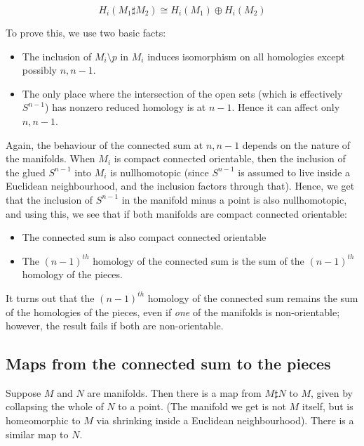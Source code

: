 \documentclass[a4paper]{amsart}
\begin{document}
$$H_i(M_1 \sharp M_2) \cong H_i(M_1) \oplus H_i(M_2)$$

To prove this, we use two basic facts:

\begin{itemize}

\item The inclusion of $M_i \setminus p$ in $M_i$ induces isomorphism
  on all homologies except possibly $n, n - 1$.

\item The only place where the intersection of the open sets (which is
  effectively $S^{n-1}$) has nonzero reduced homology is at
  $n-1$. Hence it can affect only $n,n-1$.

\end{itemize}

Again, the behaviour of the connected sum at $n,n-1$ depends on the
nature of the manifolds. When $M_i$ is compact connected orientable,
then the inclusion of the glued $S^{n-1}$ into $M_i$ is nullhomotopic
(since $S^{n-1}$ is assumed to live inside a Euclidean neighbourhood,
and the inclusion factors through that). Hence, we get that the
inclusion of $S^{n-1}$ in the manifold minus a point is also
nullhomotopic, and using this, we see that if both manifolds are
compact connected orientable:

\begin{itemize}

\item The connected sum is also compact connected orientable

\item The $(n-1)^{th}$ homology of the connected sum is the sum of the
  $(n-1)^{th}$ homology of the pieces.

\end{itemize}

It turns out that the $(n-1)^{th}$ homology of the connected sum
remains the sum of the homologies of the pieces, even if {\em one} of
the manifolds is non-orientable; however, the result fails if both are
non-orientable.

\subsection{Maps from the connected sum to the pieces}

Suppose $M$ and $N$ are manifolds. Then there is a map from $M \sharp
N$ to $M$, given by collapsing the whole of $N$ to a point. (The
manifold we get is not $M$ itself, but is homeomorphic to $M$ via
shrinking inside a Euclidean neighbourhood). There is a similar map to
$N$.
\end{document}
